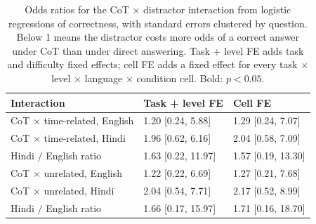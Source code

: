 \begin{table}[t]
\centering
\small
\setlength{\tabcolsep}{3pt}
\begin{tabular}{@{}lll@{}}
\toprule
Interaction & Task + level FE & Cell FE \\
\midrule
CoT $\times$ time-related, English & 1.20 [0.24, 5.88] & 1.29 [0.24, 7.07] \\
CoT $\times$ time-related, Hindi & 1.96 [0.62, 6.16] & 2.04 [0.58, 7.09] \\
\quad Hindi $/$ English ratio & 1.63 [0.22, 11.97] & 1.57 [0.19, 13.30] \\
CoT $\times$ unrelated, English & 1.22 [0.22, 6.69] & 1.27 [0.21, 7.68] \\
CoT $\times$ unrelated, Hindi & 2.04 [0.54, 7.71] & 2.17 [0.52, 8.99] \\
\quad Hindi $/$ English ratio & 1.66 [0.17, 15.97] & 1.71 [0.16, 18.70] \\
\bottomrule
\end{tabular}
\caption{Odds ratios for the CoT $\times$ distractor interaction from logistic regressions of correctness, with standard errors clustered by question. Below 1 means the distractor costs more odds of a correct answer under CoT than under direct answering. Task + level FE adds task and difficulty fixed effects; cell FE adds a fixed effect for every task $\times$ level $\times$ language $\times$ condition cell. Bold: $p<0.05$.}
\label{tab:logit}
\end{table}
